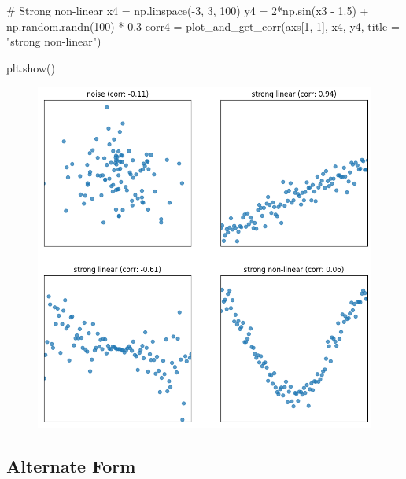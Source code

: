 \documentclass[
  letterpaper,
  DIV=11,
  numbers=noendperiod]{scrreprt}
\newenvironment{Shaded}{\begin{snugshade}}{\end{snugshade}}
\newcommand{\CommentTok}[1]{\textcolor[rgb]{0.37,0.37,0.37}{#1}}
\newcommand{\DecValTok}[1]{\textcolor[rgb]{0.68,0.00,0.00}{#1}}
\newcommand{\FloatTok}[1]{\textcolor[rgb]{0.68,0.00,0.00}{#1}}
\newcommand{\NormalTok}[1]{\textcolor[rgb]{0.00,0.23,0.31}{#1}}
\newcommand{\OperatorTok}[1]{\textcolor[rgb]{0.37,0.37,0.37}{#1}}
\newcommand{\StringTok}[1]{\textcolor[rgb]{0.13,0.47,0.30}{#1}}
\begin{document}
\begin{Shaded}
\begin{Highlighting}[]
\CommentTok{\# Strong non{-}linear}
\NormalTok{x4 }\OperatorTok{=}\NormalTok{ np.linspace(}\OperatorTok{{-}}\DecValTok{3}\NormalTok{, }\DecValTok{3}\NormalTok{, }\DecValTok{100}\NormalTok{)}
\NormalTok{y4 }\OperatorTok{=} \DecValTok{2}\OperatorTok{*}\NormalTok{np.sin(x3 }\OperatorTok{{-}} \FloatTok{1.5}\NormalTok{) }\OperatorTok{+}\NormalTok{ np.random.randn(}\DecValTok{100}\NormalTok{) }\OperatorTok{*} \FloatTok{0.3}
\NormalTok{corr4 }\OperatorTok{=}\NormalTok{ plot\_and\_get\_corr(axs[}\DecValTok{1}\NormalTok{, }\DecValTok{1}\NormalTok{], x4, y4, title }\OperatorTok{=} \StringTok{"strong non{-}linear"}\NormalTok{)}

\NormalTok{plt.show()}
\end{Highlighting}
\end{Shaded}

\begin{figure}[H]

{\centering \includegraphics{intro_to_modeling/intro_to_modeling_files/figure-pdf/cell-3-output-1.png}

}

\end{figure}

\hypertarget{alternate-form}{%
\subsection{Alternate Form}\label{alternate-form}}
\end{document}

